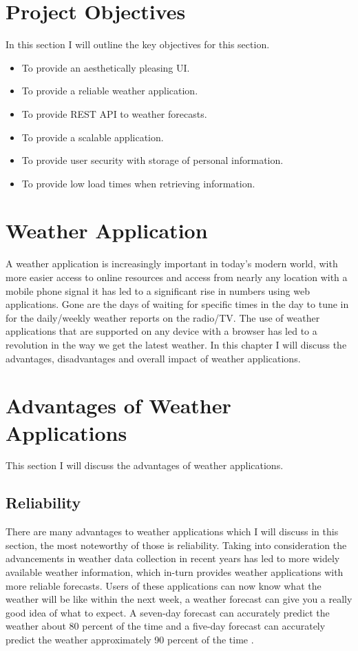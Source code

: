 \section{Project Objectives}
In this section I will outline the key objectives for this section.
\begin{itemize}
    \item To provide an aesthetically pleasing UI.
    \item To provide a reliable weather application.
    \item To provide REST API to weather forecasts.
    \item To provide a scalable application.
    \item To provide user security with storage of personal information.
    \item To provide low load times when retrieving information.
\end{itemize}

\section{Weather Application}
A weather application is increasingly important in today's modern world, with more easier access to online resources and access from nearly any location with a mobile phone signal it has led to a significant rise in numbers using web applications. Gone are the days of waiting for specific times in the day to tune in for the daily/weekly weather reports on the radio/TV. The use of weather applications that are supported on any device with a browser has led to a revolution in the way we get the latest weather. In this chapter I will discuss the advantages, disadvantages and overall impact of weather applications.

\section{Advantages of Weather Applications}
This section I will discuss the advantages of weather applications.

\subsection{Reliability}
There are many advantages to weather applications which I will discuss in this section, the most noteworthy of those is reliability. Taking into consideration the advancements in weather data collection in recent years has led to more widely available weather information, which in-turn provides weather applications with more reliable forecasts. Users of these applications can now know what the weather will be like within the next week, a weather forecast can give you a really good idea of what to expect. A seven-day forecast can accurately predict the weather about 80 percent of the time and a five-day forecast can accurately predict the weather approximately 90 percent of the time \cite{weatherReliability}. 

